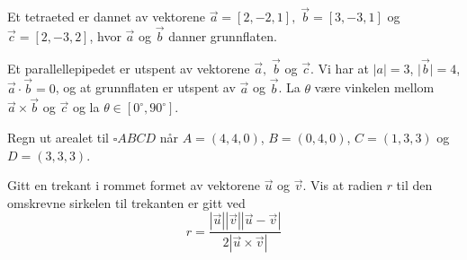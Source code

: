 Et tetraeted er dannet av vektorene $ \vec{a}=[2, -2, 1],\; \vec{b}=[3, -3, 1] $ og $ \vec{c}=[2, -3, 2] $, hvor $ \vec{a} $ og $ \vec{b} $ danner grunnflaten.

\newpage


Et parallellepipedet er utspent av vektorene $ \vec{a},\; \vec{b} $ og $ \vec{c} $. Vi har at ${|a|=3}$,  $|{\vec{b}|=4}$, $ {\vec{a}\cdot \vec{b}=0}  $, og at grunnflaten er utspent av $ \vec{a} $ og $ \vec{b} $.
La $ \theta $ være vinkelen mellom $ {\vec{a}\times\vec{b}} $ og $ \vec{c} $ og la $ {\theta\in[0^\circ, 90^\circ]} $.

Regn ut arealet til $\square ABCD$ når $A=(4, 4, 0)$, $B=(0, 4, 0)$, $C=(1, 3, 3)$ og $D=(3, 3, 3)$.	



Gitt en trekant i rommet formet av vektorene $\vec{u}$ og $\vec{v}$. Vis at radien $r$ til den omskrevne sirkelen til trekanten er gitt ved
\[ r=\frac{|\vec{u}||\vec{v}||\vec{u}-\vec{v}|}{2|\vec{u}\times\vec{v}|} \]

